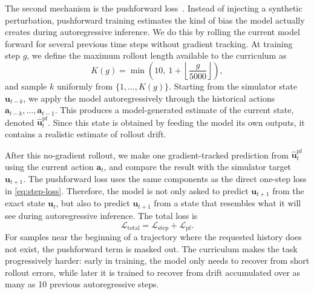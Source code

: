 \documentclass[pdflatex,sn-mathphys-ay]{sn-jnl}
\newcommand{\svec}{\mathbf{u}}            %
\newcommand{\action}{\mathbf{a}}           %
\begin{document}
The second mechanism is the pushforward loss~\citep{brandstetter2022pushforward}.
Instead of injecting a synthetic perturbation, pushforward training estimates the
kind of bias the model actually creates during autoregressive inference. We do
this by rolling the current model forward for several previous time steps without
gradient tracking. At training step \(g\), we define the maximum rollout length
available to the curriculum as
\begin{equation}
  K(g)=\min\!\left(10,\ 1+\left\lfloor \frac{g}{5000}\right\rfloor\right),
  \label{eq:k-curriculum}
\end{equation}
and sample \(k\) uniformly from \(\{1,\ldots,K(g)\}\). Starting from the
simulator state \(\svec_{t-k}\), we apply the model autoregressively through the
historical actions \(\action_{t-k},\ldots,\action_{t-1}\). This produces a
model-generated estimate of the current state, denoted
\(\hat{\svec}_t^{\mathrm{pf}}\). Since this state is obtained by feeding the
model its own outputs, it contains a realistic estimate of rollout drift.

After this no-gradient rollout, we make one gradient-tracked prediction from
\(\hat{\svec}_t^{\mathrm{pf}}\) using the current action \(\action_t\), and
compare the result with the simulator target \(\svec_{t+1}\). The pushforward
loss uses the same components as the direct one-step loss in
\cref{eq:step-loss}. Therefore, the model is not only asked to predict
\(\svec_{t+1}\) from the exact state \(\svec_t\), but also to predict
\(\svec_{t+1}\) from a state that resembles what it will see during
autoregressive inference. The total loss is
\begin{equation}
  \mathcal{L}_{\mathrm{total}}
  =
  \mathcal{L}_{\mathrm{step}}
  +
  \mathcal{L}_{\mathrm{pf}} .
  \label{eq:total-loss}
\end{equation}
For samples near the beginning of a trajectory where the requested history does
not exist, the pushforward term is masked out. The curriculum makes the task
progressively harder: early in training, the model only needs to recover from
short rollout errors, while later it is trained to recover from drift accumulated
over as many as 10 previous autoregressive steps.
\end{document}
